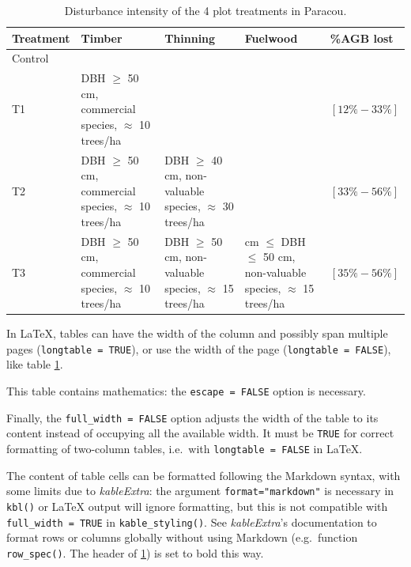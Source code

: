 \documentclass[fleqn,]{article} %
\begin{document}
\normalsize



\scriptsize

\begin{table}
\centering
\caption{\label{tab:Paracou}Disturbance intensity of the 4 plot treatments in Paracou.}
\centering
\begin{tabularx}{\linewidth}{>{\raggedright\arraybackslash}X>{\raggedright\arraybackslash}X>{\raggedright\arraybackslash}X>{\raggedright\arraybackslash}X>{\raggedright\arraybackslash}X}
\toprule
\textbf{Treatment} & \textbf{Timber} & \textbf{Thinning} & \textbf{Fuelwood} & \textbf{\%AGB lost}\\
\midrule
Control &  &  &  & 0\\
T1 & DBH $\geq$ 50 cm, commercial species, $\approx$ 10 trees/ha &  &  & $[12\%-33\%]$\\
T2 & DBH $\geq$ 50 cm, commercial species, $\approx$ 10 trees/ha & DBH $\geq$ 40 cm, non-valuable species, $\approx$ 30 trees/ha &  & $[33\%-56\%]$\\
T3 & DBH $\geq$ 50 cm, commercial species, $\approx$ 10 trees/ha & DBH $\geq$ 50 cm, non-valuable species, $\approx$ 15 trees/ha & 40 cm $\leq$ DBH $\leq$ 50 cm, non-valuable species, $\approx$ 15 trees/ha & $[35\%-56\%]$\\
\bottomrule
\end{tabularx}
\end{table}

\normalsize

In LaTeX, tables can have the width of the column and possibly span multiple pages (\texttt{longtable\ =\ TRUE}), or use the width of the page (\texttt{longtable\ =\ FALSE}), like table \ref{tab:Paracou}.

This table contains mathematics: the \texttt{escape\ =\ FALSE} option is necessary.

Finally, the \texttt{full\_width\ =\ FALSE} option adjusts the width of the table to its content instead of occupying all the available width.
It must be \texttt{TRUE} for correct formatting of two-column tables, i.e.~with \texttt{longtable\ =\ FALSE} in LaTeX.

The content of table cells can be formatted following the Markdown syntax, with some limits due to \emph{kableExtra}: the argument \texttt{format="markdown"} is necessary in \texttt{kbl()} or LaTeX output will ignore formatting, but this is not compatible with \texttt{full\_width\ =\ TRUE} in \texttt{kable\_styling()}.
See \emph{kableExtra}'s documentation to format rows or columns globally without using Markdown (e.g.~function \texttt{row\_spec()}.
The header of \ref{tab:Paracou}) is set to bold this way.
\end{document}
